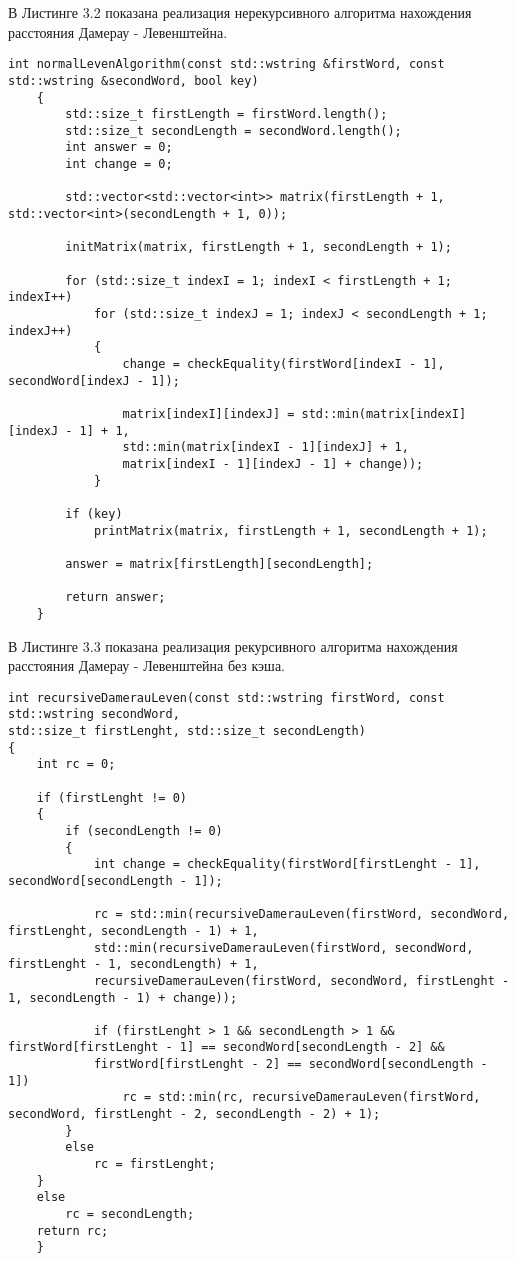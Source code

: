 \newpage

\hspace{0.6cm}В Листинге 3.2 показана реализация нерекурсивного алгоритма нахождения расстояния Дамерау - Левенштейна.
\begin{lstlisting}[caption=Нерекурсивный алгоритм поиска расстояния Дамерау - Левенштейна]
	int normalLevenAlgorithm(const std::wstring &firstWord, const std::wstring &secondWord, bool key)
	{
		std::size_t firstLength = firstWord.length(); 
		std::size_t secondLength = secondWord.length();
		int answer = 0; 
		int change = 0; 
		
		std::vector<std::vector<int>> matrix(firstLength + 1, std::vector<int>(secondLength + 1, 0));
		
		initMatrix(matrix, firstLength + 1, secondLength + 1);
		
		for (std::size_t indexI = 1; indexI < firstLength + 1; indexI++)
			for (std::size_t indexJ = 1; indexJ < secondLength + 1; indexJ++)
			{
				change = checkEquality(firstWord[indexI - 1], secondWord[indexJ - 1]);
			
				matrix[indexI][indexJ] = std::min(matrix[indexI][indexJ - 1] + 1,
				std::min(matrix[indexI - 1][indexJ] + 1,
				matrix[indexI - 1][indexJ - 1] + change));
			}
		
		if (key)
			printMatrix(matrix, firstLength + 1, secondLength + 1);
		
		answer = matrix[firstLength][secondLength];     
		
		return answer;
	}
\end{lstlisting}

\vspace{60mm} 

В Листинге 3.3 показана реализация рекурсивного алгоритма нахождения расстояния Дамерау - Левенштейна без кэша.
\begin{lstlisting}[caption=Рекурсивный алгоритм поиска расстояния Дамерау - Левенштейна без кэша]
int recursiveDamerauLeven(const std::wstring firstWord, const std::wstring secondWord,
std::size_t firstLenght, std::size_t secondLength)
{
	int rc = 0;
	
	if (firstLenght != 0)
	{
		if (secondLength != 0)
		{
			int change = checkEquality(firstWord[firstLenght - 1], secondWord[secondLength - 1]);
			
			rc = std::min(recursiveDamerauLeven(firstWord, secondWord, firstLenght, secondLength - 1) + 1,
			std::min(recursiveDamerauLeven(firstWord, secondWord, firstLenght - 1, secondLength) + 1,
			recursiveDamerauLeven(firstWord, secondWord, firstLenght - 1, secondLength - 1) + change));
			
			if (firstLenght > 1 && secondLength > 1 && firstWord[firstLenght - 1] == secondWord[secondLength - 2] &&
			firstWord[firstLenght - 2] == secondWord[secondLength - 1])
				rc = std::min(rc, recursiveDamerauLeven(firstWord, secondWord, firstLenght - 2, secondLength - 2) + 1);
		}
		else
			rc = firstLenght;
	}
	else 
		rc = secondLength;    
	return rc;
	}
\end{lstlisting}

